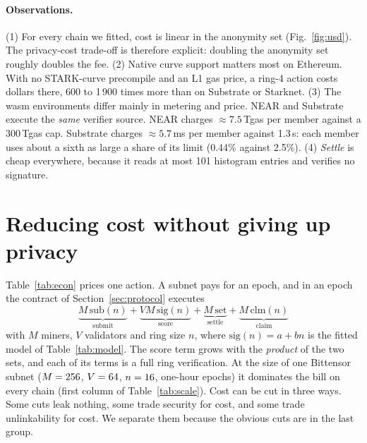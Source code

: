 \documentclass[11pt]{article}
\theoremstyle{remark}
\begin{document}
\paragraph{Observations.} (1) For every chain we fitted, cost is linear in the anonymity set (Fig.~\ref{fig:usd}). The privacy-cost trade-off is therefore explicit: doubling the anonymity set roughly doubles the fee. (2) Native curve support matters most on Ethereum. With no STARK-curve precompile and an L1 gas price, a ring-4 action costs dollars there, 600 to 1\,900 times more than on Substrate or Starknet. (3) The wasm environments differ mainly in metering and price. NEAR and Substrate execute the \emph{same} verifier source. NEAR charges $\approx7.5$\,Tgas per member against a 300\,Tgas cap. Substrate charges $\approx5.7$\,ms per member against 1.3\,s: each member uses about a sixth as large a share of its limit (0.44\% against 2.5\%). (4) \emph{Settle} is cheap everywhere, because it reads at most 101 histogram entries and verifies no signature.

\section{Reducing cost without giving up privacy}\label{sec:cost}

Table~\ref{tab:econ} prices one action. A subnet pays for an epoch, and in an epoch the contract of Section~\ref{sec:protocol} executes
\[
\underbrace{M\,\mathrm{sub}(n)}_{\text{submit}} + \underbrace{V M\,\mathrm{sig}(n)}_{\text{score}} + \underbrace{M\,\mathrm{set}}_{\text{settle}} + \underbrace{M\,\mathrm{clm}(n)}_{\text{claim}}
\]
with $M$ miners, $V$ validators and ring size $n$, where $\mathrm{sig}(n)=a+bn$ is the fitted model of Table~\ref{tab:model}. The score term grows with the \emph{product} of the two sets, and each of its terms is a full ring verification. At the size of one Bittensor subnet ($M=256$, $V=64$, $n=16$, one-hour epochs) it dominates the bill on every chain (first column of Table~\ref{tab:scale}). Cost can be cut in three ways. Some cuts leak nothing, some trade security for cost, and some trade unlinkability for cost. We separate them because the obvious cuts are in the last group.
\end{document}

